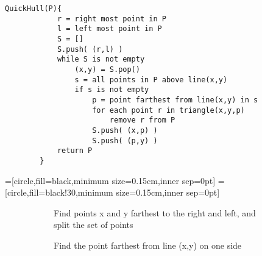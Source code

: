 \documentclass{article}
\begin{document}
		\begin{lstlisting}[style=pseudo]
		QuickHull(P){
			r = right most point in P
			l = left most point in P
			S = []
			S.push( (r,l) )
			while S is not empty
				(x,y) = S.pop()
				s = all points in P above line(x,y)
				if s is not empty
					p = point farthest from line(x,y) in s
					for each point r in triangle(x,y,p)
						remove r from P
					S.push( (x,p) )
					S.push( (p,y) )
			return P
		}
		\end{lstlisting}

		=[circle,fill=black,minimum size=0.15cm,inner sep=0pt]
		=[circle,fill=black!30,minimum size=0.15cm,inner sep=0pt]
		\begin{figure}[h]
			\centering
			\begin{subfigure}[b][7cm][b]{.45\textwidth}
				\centering
				{\caption*{Find points x and y farthest to the right and left, and split the set of points}}
			\end{subfigure}
			\begin{subfigure}[b][7cm][b]{.45\textwidth}
				\centering
				{\caption*{Find the point farthest from line (x,y) on one side}}
			\end{subfigure}
			\begin{subfigure}[b][7cm][b]{.45\textwidth}
				\centering
\end{subfigure}
\end{figure}
\end{document}
